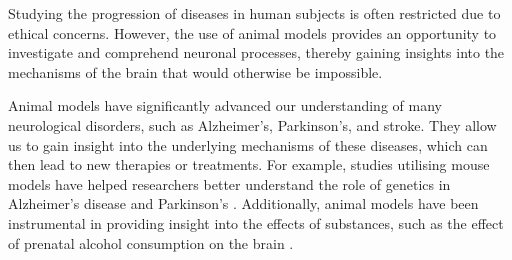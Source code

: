 \documentclass[10pt]{article}
\begin{document}
\begin{sloppypar}
  \vspace{10pt} %
  \begin{table}[ht]
    \centering
    \renewcommand{\arraystretch}{1.5}
    \setlength{\tabcolsep}{12pt}
    \caption{Overview of in vitro, in vivo, and in silico research methods.}
    \label{tab:overview-research-methods}
  \end{table}

  Studying the progression of diseases in human subjects is often restricted due to ethical concerns. However, the use of animal models provides an opportunity to investigate and comprehend neuronal processes, thereby gaining insights into the mechanisms of the brain that would otherwise be impossible.

  Animal models have significantly advanced our understanding of many neurological disorders, such as Alzheimer’s, Parkinson’s, and stroke. They allow us to gain insight into the underlying mechanisms of these diseases, which can then lead to new therapies or treatments. For example, studies utilising mouse models have helped researchers better understand the role of genetics in Alzheimer’s disease \citep{holtzman_alzheimers_2011} and Parkinson’s \citep{hernandez_genetics_2016}. Additionally, animal models have been instrumental in providing insight into the effects of substances, such as the effect of prenatal alcohol consumption on the brain \citep{bisen_proteomic_2019}.


\end{sloppypar}
\end{document}
